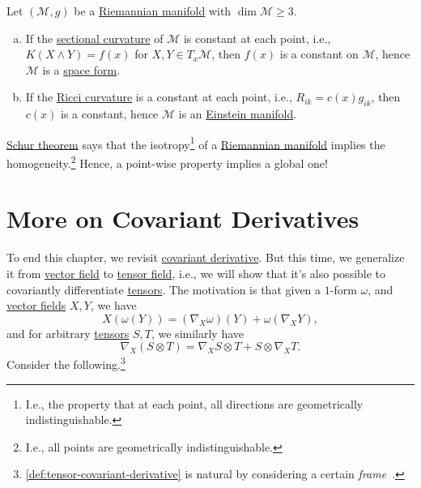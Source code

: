 \begin{theorem}\label{thm:Schur}
	Let \((\mathcal{M} , g)\) be a \hyperref[def:Riemannian-manifold]{Riemannian manifold} with \(\dim \mathcal{M} \geq 3\).
	\begin{enumerate}[(a)]
		\item If the \hyperref[def:sectional-curvature]{sectional curvature} of \(\mathcal{M} \) is constant at each point, i.e., \(K(X\wedge Y) = f(x)\) for \(X, Y\in T_x \mathcal{M} \), then \(f(x)\) is a constant on \(\mathcal{M} \), hence \(\mathcal{M} \) is a \hyperref[def:space-form]{space form}.
		\item If the \hyperref[def:Ricci-curvature]{Ricci curvature} is a constant at each point, i.e., \(R_{ik} = c(x) g_{ik}\), then \(c(x)\) is a constant, hence \(\mathcal{M} \) is an \hyperref[def:Einstein-manifold]{Einstein manifold}.
	\end{enumerate}
\end{theorem}

\begin{remark}
	\hyperref[thm:Schur]{Schur theorem} says that the isotropy\footnote{I.e., the property that at each point, all directions are geometrically indistinguishable.} of a \hyperref[def:Riemannian-manifold]{Riemannian manifold} implies the homogeneity.\footnote{I.e., all points are geometrically indistinguishable.} Hence, a point-wise property implies a global one!
\end{remark}

\section{More on Covariant Derivatives}
To end this chapter, we revisit \hyperref[def:covariant-derivative]{covariant derivative}. But this time, we generalize it from \hyperref[def:vector-field]{vector field} to \hyperref[def:tensor-field]{tensor field}, i.e., we will show that it's also possible to covariantly differentiate \hyperref[def:tensor]{tensors}. The motivation is that given a \(1\)-form \(\omega \), and \hyperref[def:vector-field]{vector fields} \(X, Y\), we have
\[
	X(\omega (Y)) = (\nabla _X \omega )(Y) + \omega (\nabla _X Y),
\]
and for arbitrary \hyperref[def:tensor]{tensors} \(S, T\), we similarly have
\[
	\nabla _X (S \otimes T) = \nabla _X S \otimes T + S \otimes \nabla _X T.
\]
Consider the following.\footnote{\autoref{def:tensor-covariant-derivative} is natural by considering a certain \emph{frame}~\cite[]{flaherty2013riemannian}.}

